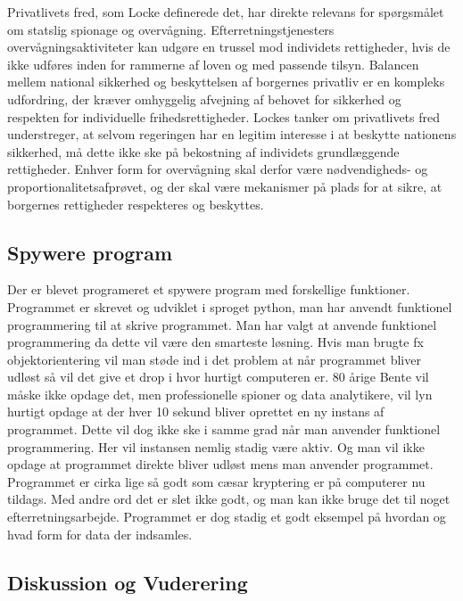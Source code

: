 Privatlivets fred, som Locke definerede det, har direkte relevans for spørgsmålet om statslig spionage og overvågning. Efterretningstjenesters overvågningsaktiviteter kan udgøre en trussel mod individets rettigheder, hvis de ikke udføres inden for rammerne af loven og med passende tilsyn. Balancen mellem national sikkerhed og beskyttelsen af borgernes privatliv er en kompleks udfordring, der kræver omhyggelig afvejning af behovet for sikkerhed og respekten for individuelle frihedsrettigheder. Lockes tanker om privatlivets fred understreger, at selvom regeringen har en legitim interesse i at beskytte nationens sikkerhed, må dette ikke ske på bekostning af individets grundlæggende rettigheder. Enhver form for overvågning skal derfor være nødvendigheds- og proportionalitetsafprøvet, og der skal være mekanismer på plads for at sikre, at borgernes rettigheder respekteres og beskyttes.

\subsection{Spywere program}
Der er blevet programeret et spywere program med forskellige funktioner. Programmet er skrevet og udviklet i sproget python, man har anvendt funktionel programmering til at skrive programmet. Man har valgt at anvende funktionel programmering da dette vil være den smarteste løsning. Hvis man brugte fx objektorientering vil man støde ind i det problem at når programmet bliver udløst så vil det give et drop i hvor hurtigt computeren er. 80 årige Bente vil måske ikke opdage det, men professionelle spioner og data analytikere, vil lyn hurtigt opdage at der hver 10 sekund bliver oprettet en ny instans af programmet. Dette vil dog ikke ske i samme grad når man anvender funktionel programmering. Her vil instansen nemlig stadig være aktiv. Og man vil ikke opdage at programmet direkte bliver udløst mens man anvender programmet. Programmet er cirka lige så godt som cæsar kryptering er på computerer nu tildags. Med andre ord det er slet ikke godt, og man kan ikke bruge det til noget efterretningsarbejde. Programmet er dog stadig et godt eksempel på hvordan og hvad form for data der indsamles. 
\newpage
\subsection{Diskussion og Vuderering}



\newpage